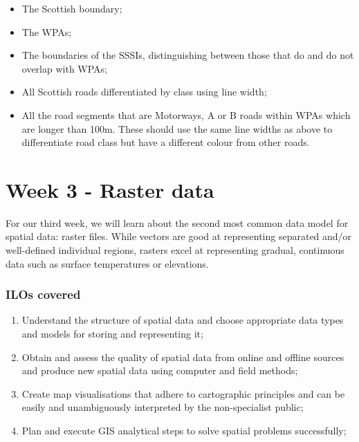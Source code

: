 \documentclass[
  letterpaper,
  DIV=11,
  numbers=noendperiod]{scrreprt}
\providecommand{\tightlist}{%
  \setlength{\itemsep}{0pt}\setlength{\parskip}{0pt}}\usepackage{longtable,booktabs,array}
\begin{document}
\begin{itemize}
\tightlist
\item
  The Scottish boundary;
\item
  The WPAs;
\item
  The boundaries of the SSSIs, distinguishing between those that do and
  do not overlap with WPAs;
\item
  All Scottish roads differentiated by class using line width;
\item
  All the road segments that are Motorways, A or B roads within WPAs
  which are longer than 100m. These should use the same line widths as
  above to differentiate road class but have a different colour from
  other roads.
\end{itemize}

\part{Week 3 - Raster data}

For our third week, we will learn about the second most common data
model for spatial data: raster files. While vectors are good at
representing separated and/or well-defined individual regions, rasters
excel at representing gradual, continuous data such as surface
temperatures or elevations.

\section*{ILOs covered}\label{ilos-covered-2}


\begin{enumerate}
\def\labelenumi{\arabic{enumi}.}
\item
  Understand the structure of spatial data and choose appropriate data
  types and models for storing and representing it;
\item
  Obtain and assess the quality of spatial data from online and offline
  sources and produce new spatial data using computer and field methods;
\item
  Create map visualisations that adhere to cartographic principles and
  can be easily and unambiguously interpreted by the non-specialist
  public;
\item
  Plan and execute GIS analytical steps to solve spatial problems
  successfully;
\end{enumerate}
\end{document}
